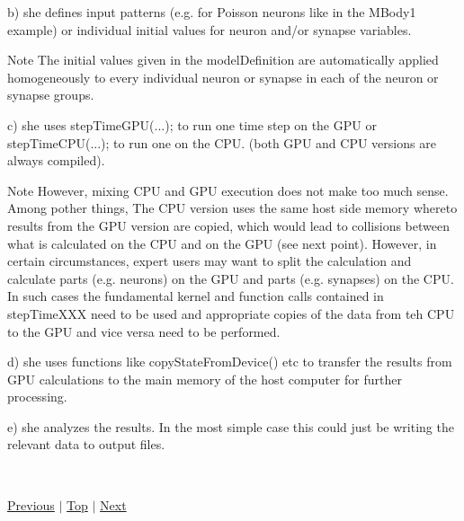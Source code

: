 \begin{DoxyEnumerate}
b) she defines input patterns (e.\+g. for Poisson neurons like in the M\+Body1 example) or individual initial values for neuron and/or synapse variables. \begin{DoxyNote}{Note}
The initial values given in the {\ttfamily model\+Definition} are automatically applied homogeneously to every individual neuron or synapse in each of the neuron or synapse groups.
\end{DoxyNote}
c) she uses {\ttfamily step\+Time\+G\+P\+U(...);} to run one time step on the G\+P\+U or {\ttfamily step\+Time\+C\+P\+U(...);} to run one on the C\+P\+U. (both G\+P\+U and C\+P\+U versions are always compiled). \begin{DoxyNote}{Note}
However, mixing C\+P\+U and G\+P\+U execution does not make too much sense. Among pother things, The C\+P\+U version uses the same host side memory whereto results from the G\+P\+U version are copied, which would lead to collisions between what is calculated on the C\+P\+U and on the G\+P\+U (see next point). However, in certain circumstances, expert users may want to split the calculation and calculate parts (e.\+g. neurons) on the G\+P\+U and parts (e.\+g. synapses) on the C\+P\+U. In such cases the fundamental kernel and function calls contained in {\ttfamily step\+Time\+X\+X\+X} need to be used and appropriate copies of the data from teh C\+P\+U to the G\+P\+U and vice versa need to be performed.
\end{DoxyNote}
d) she uses functions like {\ttfamily copy\+State\+From\+Device()} etc to transfer the results from G\+P\+U calculations to the main memory of the host computer for further processing.

e) she analyzes the results. In the most simple case this could just be writing the relevant data to output files.
\end{DoxyEnumerate}

~\newline
 

 \hyperlink{Installation}{Previous} $\vert$ \hyperlink{Quickstart}{Top} $\vert$ \hyperlink{Examples}{Next} 
